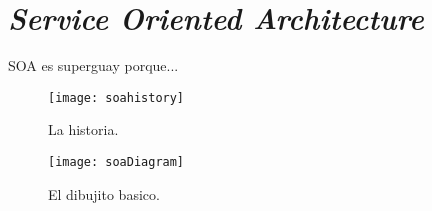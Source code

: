 

\chapter{\textit{Service Oriented Architecture}}
\label{cap:p2pcompt}


SOA es superguay porque...


\begin{figure}[htbp]
\centerline{\texttt{[image: soahistory]}}
\caption{La historia.}
\label{fig:spontaneous}
\end{figure}


\begin{figure}[htbp]
\centerline{\texttt{[image: soaDiagram]}}
\caption{El dibujito basico.}
\label{fig:spontaneous}
\end{figure}



